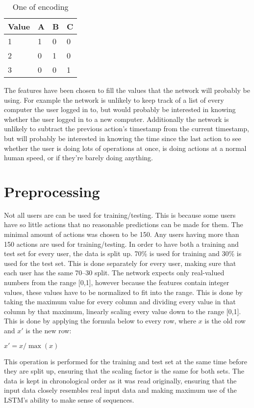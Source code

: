 \begin{table}[]
	\centering
	\caption{One of encoding}\label{one_of_encoding}
	\begin{tabular}{llll}
	Value & A & B & C \\ \midrule
	1     & 1 & 0 & 0 \\
	2     & 0 & 1 & 0 \\
	3     & 0 & 0 & 1
	\end{tabular}
\end{table}

The features have been chosen to fill the values that the network will probably be using. For example the network is unlikely to keep track of a list of every computer the user logged in to, but would probably be interested in knowing whether the user logged in to a new computer. Additionally the network is unlikely to subtract the previous action's timestamp from the current timestamp, but will probably be interested in knowing the time since the last action to see whether the user is doing lots of operations at once, is doing actions at a normal human speed, or if they're barely doing anything.

\section{Preprocessing}
Not all users are can be used for training/testing. This is because some users have so little actions that no reasonable predictions can be made for them. The minimal amount of actions was chosen to be 150. Any users having more than 150 actions are used for training/testing. In order to have both a training and test set for every user, the data is split up. 70\% is used for training and 30\% is used for the test set. This is done separately for every user, making sure that each user has the same 70--30 split. The network expects only real-valued numbers from the range [0,1], however because the features contain integer values, these values have to be normalized to fit into the range. This is done by taking the maximum value for every column and dividing every value in that column by that maximum, linearly scaling every value down to the range [0,1]. This is done by applying the formula below to every row, where \(x\) is the old row and \(x'\) is the new row:

\( x' = x / \max (x) \)

This operation is performed for the training and test set at the same time before they are split up, ensuring that the scaling factor is the same for both sets. The data is kept in chronological order as it was read originally, ensuring that the input data closely resembles real input data and making maximum use of the LSTM's ability to make sense of sequences.

